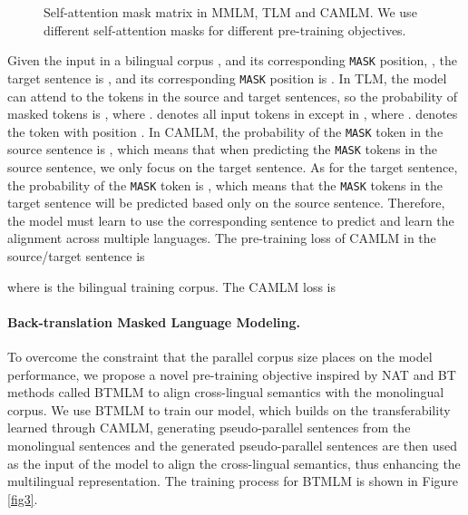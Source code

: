 \documentclass[11pt]{article}
\begin{document}
\begin{figure}[!htp]
\centering
\vspace{-0.1in}
\caption{Self-attention mask matrix in MMLM, TLM and CAMLM. We use different self-attention masks for different pre-training objectives.}
\label{fig2}
\vskip -0in
\end{figure}

Given the input in a bilingual corpus , and its corresponding \texttt{MASK} position, , the target sentence is , and its corresponding \texttt{MASK} position is . In TLM, the model can attend to the tokens in the source and target sentences, so the probability of masked tokens is , where .  denotes all input tokens  in  except  in , where .  denotes the token with position . In CAMLM, the probability of the \texttt{MASK} token in the source sentence is , which means that when predicting the \texttt{MASK} tokens in the source sentence, we only focus on the target sentence. As for the target sentence, the probability of the \texttt{MASK} token is , which means that the \texttt{MASK} tokens in the target sentence will be predicted based only on the source sentence. Therefore, the model must learn to use the corresponding sentence to predict and learn the alignment across multiple languages.
The pre-training loss of CAMLM in the source/target sentence is



where  is the bilingual training corpus. The CAMLM loss is

\paragraph{Back-translation Masked Language Modeling.}
To overcome the constraint that the parallel corpus size places on the model performance, we propose a novel pre-training objective inspired by NAT \cite{gu2017non,wang2019non} and BT methods called BTMLM to align cross-lingual semantics with the monolingual corpus. We use BTMLM to train our model, which builds on the transferability learned through CAMLM, generating pseudo-parallel sentences from the monolingual sentences and the generated pseudo-parallel sentences are then used as the input of the model to align the cross-lingual semantics, thus enhancing the multilingual representation. The training process for BTMLM is shown in Figure \ref{fig3}.
\end{document}
